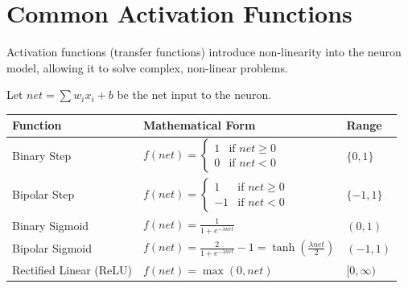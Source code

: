 \documentclass[12pt,a4paper]{article}
\renewcommand{\arraystretch}{1.45}
\begin{document}
\section{Common Activation Functions}

Activation functions (transfer functions) introduce non-linearity into the neuron model, allowing it to solve complex, non-linear problems.

\begin{tcolorbox}[formulabox, title={Mathematical Formulations of Activation Functions}]
Let $net = \sum w_i x_i + b$ be the net input to the neuron.
\par\vspace{4pt}
{\renewcommand{\arraystretch}{1.9}%
\begin{tabularx}{\linewidth}{B{3.2cm} Y B{3.8cm}}
\hline
Function & Mathematical Form & Range \\[4pt]
\hline
Binary Step & $f(net) = \begin{cases} 1 & \text{if } net \ge 0 \\ 0 & \text{if } net < 0 \end{cases}$ & $\{0, 1\}$ \\[8pt]
\hline
Bipolar Step & $f(net) = \begin{cases} 1 & \text{if } net \ge 0 \\ -1 & \text{if } net < 0 \end{cases}$ & $\{-1, 1\}$ \\[8pt]
\hline
Binary Sigmoid & $f(net) = \frac{1}{1 + e^{-\lambda net}}$ & $(0, 1)$ \\[6pt]
\hline
Bipolar Sigmoid & $f(net) = \frac{2}{1 + e^{-\lambda net}} - 1 = \tanh\left(\frac{\lambda net}{2}\right)$ & $(-1, 1)$ \\[6pt]
\hline
Rectified Linear (ReLU) & $f(net) = \max(0, net)$ & $[0, \infty)$ \\[4pt]
\hline
\end{tabularx}}
\end{tcolorbox}
\end{document}
